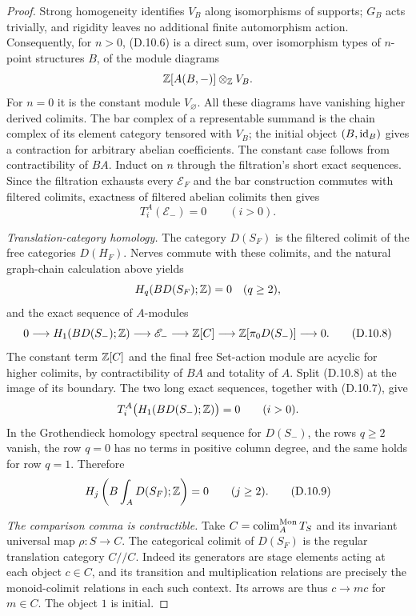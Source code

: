 \begin{proof}
Strong homogeneity identifies $V_B$ along isomorphisms of
supports; $G_B$ acts trivially, and rigidity leaves no additional
finite automorphism action. Consequently, for $n>0$, (D.10.6)
is a direct sum, over isomorphism types of $n$-point structures
$B$, of the module diagrams
\[
                    \mathbb Z[A(B,-)]\otimes_\mathbb Z V_B.
\]
For $n=0$ it is the constant module $V_\varnothing$. All these
diagrams have vanishing higher derived colimits. The bar complex
of a representable summand is the chain complex of its element
category tensored with $V_B$; the initial object $(B,\mathrm{id}_B)$
gives a contraction for arbitrary abelian coefficients. The
constant case follows from contractibility of $BA$.
Induct on $n$ through the filtration's short exact sequences.
Since the filtration exhausts every $\mathscr E_F$ and the bar
construction commutes with filtered colimits, exactness of
filtered abelian colimits then gives
\[
                         T_i^A(\mathscr E_-) =0\qquad(i>0).
 \tag{D.10.7}
\]

\emph{Translation-category homology.}
The category $D(S_F)$ is the filtered colimit of the free
categories $D(H_F)$. Nerves commute with these colimits, and the
natural graph-chain calculation above yields
\[
 H_q(BD(S_F);\mathbb Z)=0\quad(q\geq2),
\]
and the exact sequence of $A$-modules
\[
 0\longrightarrow H_1(BD(S_-);\mathbb Z)
 \longrightarrow\mathscr E_-
 \longrightarrow\mathbb Z[C]
 \longrightarrow\mathbb Z[\pi_0D(S_-)]\longrightarrow0.
 \tag{D.10.8}
\]
The constant term $\mathbb Z[C]$ and the final free Set-action module
are acyclic for higher colimits, by contractibility of $BA$ and
totality of $A$. Split (D.10.8) at the image of its boundary.
The two long exact sequences, together with (D.10.7), give
\[
              T_i^A\bigl(H_1(BD(S_-);\mathbb Z)\bigr)=0\qquad(i>0).
\]
In the Grothendieck homology spectral sequence for $D(S_-)$,
the rows $q\geq2$ vanish, the row $q=0$ has no terms in
positive column degree, and the same holds for row $q=1$.
Therefore
\[
                 H_j\left(B\int_A D(S_F);\mathbb Z\right)=0
                 \qquad(j\geq2).
 \tag{D.10.9}
\]

\emph{The comparison comma is contractible.}
Take $C=\operatorname*{colim}_A^{\mathrm{Mon}}T_S$ and its invariant universal
map $\rho:S\to C$. The categorical colimit of $D(S_F)$ is the
regular translation category $C//C$. Indeed its generators are
stage elements acting at each object $c\in C$, and its transition
and multiplication relations are precisely the monoid-colimit
relations in each such context. Its arrows are thus $c\to mc$
for $m\in C$. The object $1$ is initial.


\end{proof}
